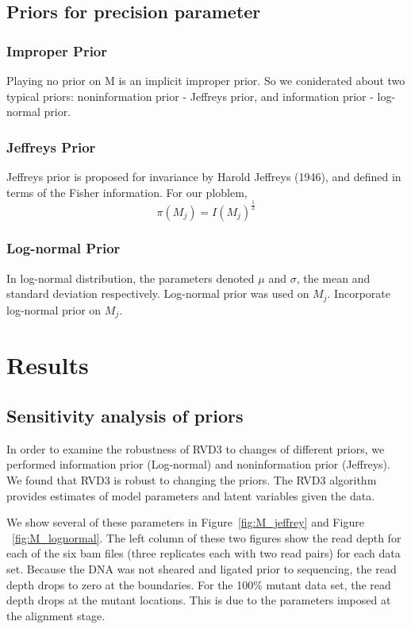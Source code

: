 \documentclass[11pt,reqno]{amsart}
\begin{document}
\subsection{Priors for precision parameter}
\subsubsection{Improper Prior}
Playing no prior on M is an implicit improper prior. So we coniderated about two typical priors: noninformation prior - Jeffreys prior, and information prior - log-normal prior.

\subsubsection{Jeffreys Prior}
Jeffreys prior is proposed for invariance by Harold Jeffreys (1946), and defined in terms of the Fisher information. For our ploblem,
\begin{equation}\label{eqn:JefferyPrior}
\pi\left({M}_{j}\right)= I\left({M}_{j}\right)^{\frac{1}{2}}
\end{equation}

\subsubsection{Log-normal Prior}
In log-normal distribution, the parameters denoted $\mu$ and $\sigma$, the mean and standard deviation respectively. Log-normal prior was used on $ M_{j}$.
Incorporate log-normal prior on $M_{j}$.


\section{Results}

\subsection{Sensitivity analysis of priors}
In order to examine the robustness of RVD3 to changes of different priors, we performed information prior (Log-normal) and noninformation prior (Jeffreys). We found that RVD3 is robust to changing the priors. The RVD3 algorithm provides estimates of model parameters and latent variables given the data.

We show several of these parameters in Figure~\ref{fig:M_jeffrey} and Figure ~\ref{fig:M_lognormal}. The left column of these two figures show the read depth for each of the six bam files (three replicates each with two read pairs) for each data set. Because the DNA was not sheared and ligated prior to sequencing, the read depth drops to zero at the boundaries. For the 100\% mutant data set, the read depth drops at the mutant locations. This is due to the parameters imposed at the alignment stage.
\end{document}
